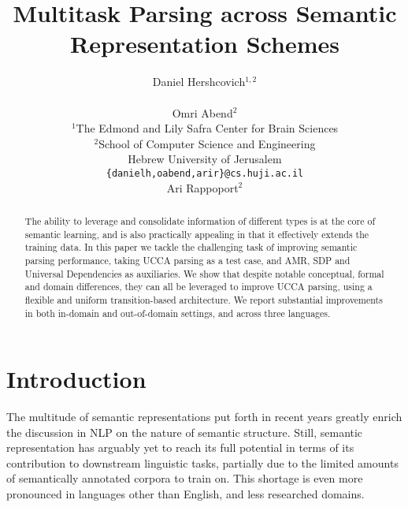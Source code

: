 \documentclass[11pt,a4paper]{article}
\title{Multitask Parsing across Semantic Representation Schemes}
\author{Daniel Hershcovich$^{1,2}$ \\
  \\\And
  Omri Abend$^2$ \\
  $^1$The Edmond and Lily Safra Center for Brain Sciences \\
  $^2$School of Computer Science and Engineering \\
  Hebrew University of Jerusalem \\
  \texttt{\{danielh,oabend,arir\}@cs.huji.ac.il}
  \\\And
  Ari Rappoport$^2$
}
\date{}
\begin{document}
\maketitle

\begin{abstract}
The ability to leverage and consolidate information of different types
is at the core of semantic learning, and is also practically appealing
in that it effectively extends the training data. In this paper we
tackle the challenging task of improving semantic parsing
performance, taking UCCA
parsing as a test case, and AMR, SDP and Universal Dependencies
as auxiliaries. We show that despite notable conceptual,
formal and domain differences, they can all be
leveraged to improve UCCA parsing, using a flexible and uniform
transition-based architecture. We report substantial improvements
in both in-domain and out-of-domain settings, and across three languages.
\end{abstract}

\section{Introduction}\label{sec:introduction}

The multitude of semantic representations put forth in recent years greatly enrich
the discussion in NLP on the nature of semantic structure.
Still, semantic representation has arguably yet to reach its full 
potential in terms of its contribution to downstream linguistic tasks,
partially due to the limited amounts of semantically annotated
corpora to train on. This shortage is even more pronounced in 
languages other than English, and less researched domains. 

\end{document}

